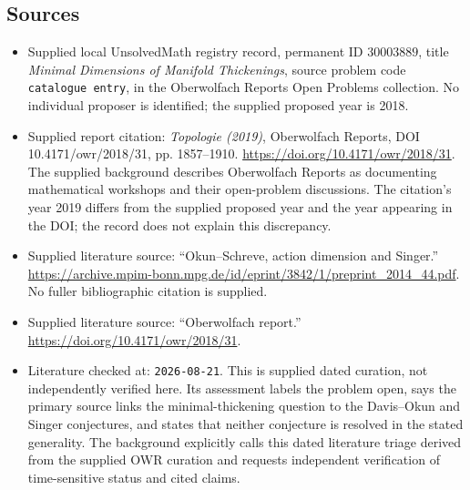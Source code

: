 \documentclass[11pt]{article}
\begin{document}
\subsection{Sources}
\begin{itemize}
\item Supplied local UnsolvedMath registry record, permanent ID \(30003889\), title \emph{Minimal Dimensions of Manifold Thickenings}, source problem code \texttt{catalogue entry}, in the Oberwolfach Reports Open Problems collection. No individual proposer is identified; the supplied proposed year is 2018.
\item Supplied report citation: \emph{Topologie (2019)}, Oberwolfach Reports, DOI 10.4171/owr/2018/31, pp. 1857--1910. \url{https://doi.org/10.4171/owr/2018/31}. The supplied background describes Oberwolfach Reports as documenting mathematical workshops and their open-problem discussions. The citation's year 2019 differs from the supplied proposed year and the year appearing in the DOI; the record does not explain this discrepancy.
\item Supplied literature source: ``Okun--Schreve, action dimension and Singer.'' \url{https://archive.mpim-bonn.mpg.de/id/eprint/3842/1/preprint_2014_44.pdf}. No fuller bibliographic citation is supplied.
\item Supplied literature source: ``Oberwolfach report.'' \url{https://doi.org/10.4171/owr/2018/31}.
\item Literature checked at: \texttt{2026-08-21}. This is supplied dated curation, not independently verified here. Its assessment labels the problem open, says the primary source links the minimal-thickening question to the Davis--Okun and Singer conjectures, and states that neither conjecture is resolved in the stated generality. The background explicitly calls this dated literature triage derived from the supplied OWR curation and requests independent verification of time-sensitive status and cited claims.
\end{itemize}
\end{document}
